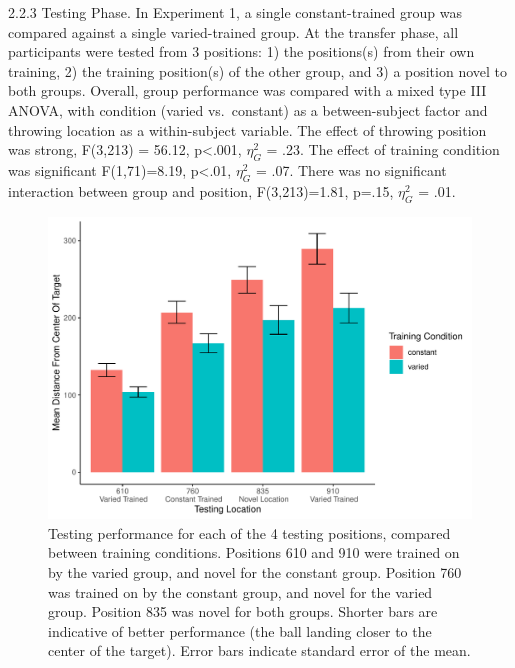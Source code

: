 \documentclass[
  man,floatsintext]{apa7}
\begin{document}
2.2.3 Testing Phase. In Experiment 1, a single constant-trained group was compared against a single varied-trained group. At the transfer phase, all participants were tested from 3 positions: 1) the positions(s) from their own training, 2) the training position(s) of the other group, and 3) a position novel to both groups. Overall, group performance was compared with a mixed type III ANOVA, with condition (varied vs.~constant) as a between-subject factor and throwing location as a within-subject variable. The effect of throwing position was strong, F(3,213) = 56.12, p\textless.001, \(\eta^{2}_G\) = .23. The effect of training condition was significant F(1,71)=8.19, p\textless.01, \(\eta^{2}_G\) = .07. There was no significant interaction between group and position, F(3,213)=1.81, p=.15, \(\eta^{2}_G\) = .01.



\begin{figure}
\centering
\includegraphics{IGAS_PJ_files/figure-latex/e1Test-1.pdf}
\caption{\label{fig:e1Test}Testing performance for each of the 4 testing positions, compared between training conditions. Positions 610 and 910 were trained on by the varied group, and novel for the constant group. Position 760 was trained on by the constant group, and novel for the varied group. Position 835 was novel for both groups. Shorter bars are indicative of better performance (the ball landing closer to the center of the target). Error bars indicate standard error of the mean.}
\end{figure}
\end{document}
